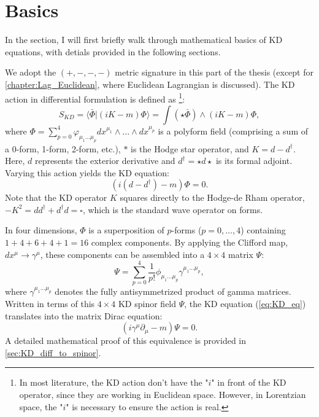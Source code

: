 \section{Basics}


In the section, I will first briefly walk through mathematical basics of KD equations, with detials provided in the following sections.

We adopt the $(+,-,-,-)$ metric signature in this part of the thesis (except for \cref{chapter:Lag_Euclidean}, where Euclidean Lagrangian is discussed). The KD action in differential formulation is defined as \footnote{In most literature, the KD action don't have the "$i$" in front of the KD operator, since they are working in Euclidean space. However, in Lorentzian space, the "$i$" is necessary to ensure the action is real.}:
\begin{equation}\label{eq:KD_action}
  S_{KD}=\langle \bar{\Phi}|(iK-m)\Phi\rangle=
  \int (\star\bar{\Phi})\wedge(iK-m)\Phi,
\end{equation}
where $\Phi=\sum_{p=0}^{4}\varphi_{\mu_1\ldots\mu_p}dx^{\mu_1}\wedge\ldots\wedge dx^{\mu_p}$ is a polyform field (comprising a sum of a 0-form, 1-form, 2-form, etc.), $\ast$ is the Hodge star operator, and $K=d-d^{\dagger}$. Here, $d$ represents the exterior derivative and $d^{\dagger}=\star d \star$ is its formal adjoint. Varying this action yields the KD equation:
\begin{equation}\label{eq:KD_eq}
    (i(d - d^\dagger) - m)\Phi = 0.
\end{equation}
Note that the KD operator $K$ squares directly to the Hodge-de Rham operator, $-K^2 = dd^\dagger + d^\dagger d = \square$, which is the standard wave operator on forms.

In four dimensions, $\Phi$ is a superposition of $p$-forms ($p=0,\dots,4$) containing $1+4+6+4+1=16$ complex components. By applying the Clifford map, $dx^{\mu}\to\gamma^{\mu}$, these components can be assembled into a $4\times4$ matrix $\Psi$:
\begin{equation}
    \Psi = \sum_{p=0}^4 \frac{1}{p!}\phi_{\mu_1\dots \mu_p}\gamma^{\mu_1\dots \mu_p},
\end{equation}
where $\gamma^{\mu_1\dots \mu_p}$ denotes the fully antisymmetrized product of gamma matrices. Written in terms of this $4\times 4$ KD spinor field $\Psi$, the KD equation (\ref{eq:KD_eq}) translates into the matrix Dirac equation:
\begin{equation}\label{eq:KD-Dirac}
    (i\gamma^\mu \partial_\mu - m)\Psi = 0.
\end{equation}
A detailed mathematical proof of this equivalence is provided in \cref{sec:KD_diff_to_spinor}.

